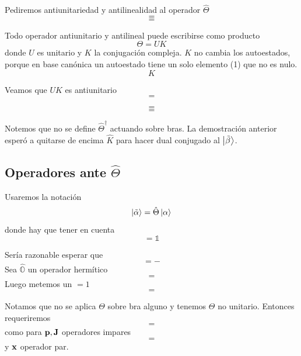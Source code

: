\documentclass[10pt,oneside]{CBFT_book}
\begin{document}
Pediremos antiunitariedad y antilinealidad al operador $\hat{\Theta}$
\[
	=
\]
\[
	=
\]

Todo operador antiunitario y antilineal puede escribirse como producto 
\[
	\Theta = U K
\]
donde $U$ es unitario y $K$ la conjugación compleja. $K$ no cambia los autoestados, porque en base canónica 
un autoestado tiene un solo elemento (1) que no es nulo.
\[
	K
\]

Veamos que $UK$ es antiunitario 
\[
	=
\]

\[
	=
\]
\[
	=
\]

Notemos que no se define $\hat{\Theta}^\dagger$ actuando sobre bras. La demostración anterior esperó a 
quitarse de encima $\hat{K}$ para hacer dual conjugado al $\Ket{\tilde{\beta}}$.

\subsection{Operadores ante $\hat{\Theta}$}

Usaremos la notación 
\[
	\Ket{\tilde{\alpha}} = \hat{\Theta} \Ket{\alpha}
\]
donde hay que tener en cuenta 
\[
	= \mathbb{1}
\]

Sería razonable esperar que 
\[
	= -
\]
Sea $\hat{\mathbb{O}}$ un operador hermítico 
\[
	=
\]
Luego metemos un $=1$
\[
	=
\]

Notamos que no se aplica $\Theta$ sobre bra alguno y tenemos $\Theta$ no unitario. Entonces requeriremos 
\[
	=
\]
como para $\vb{p},\vb{J}$ operadores impares 
\[
	=
\]
y $\vb{x}$ operador par.
\end{document}
